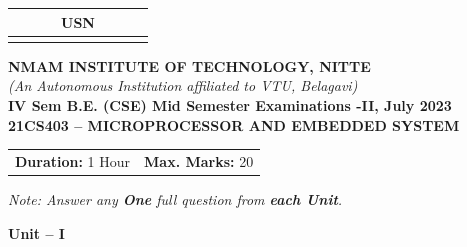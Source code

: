 \documentclass[12pt,a4paper]{article}
\begin{document}
\begin{center}
\begin{tabular}{|c|c|c|c|c|c|c|c|c|c|}
\hline
\multicolumn{10}{|c|}{USN} \\
\hline
& & & & & & & & & \\
\hline
\end{tabular}

\vspace{0.5cm}

{\Large \textbf{NMAM INSTITUTE OF TECHNOLOGY, NITTE}}\\[0.2cm]
{\small \textit{(An Autonomous Institution affiliated to VTU, Belagavi)}}\\[0.3cm]
{\large \textbf{IV Sem B.E. (CSE) Mid Semester Examinations -II, July 2023}}\\[0.2cm]
{\large \textbf{21CS403 -- MICROPROCESSOR AND EMBEDDED SYSTEM}}\\[0.3cm]
\end{center}

\noindent
\begin{tabular}{p{8cm}r}
\textbf{Duration:} 1 Hour & \textbf{Max. Marks:} 20
\end{tabular}

\vspace{0.3cm}
\begin{center}
\textit{Note: Answer any \textbf{One} full question from \textbf{each Unit}.}
\end{center}

\vspace{0.3cm}

\begin{center}
{\large \textbf{Unit -- I}}
\end{center}
\end{document}
